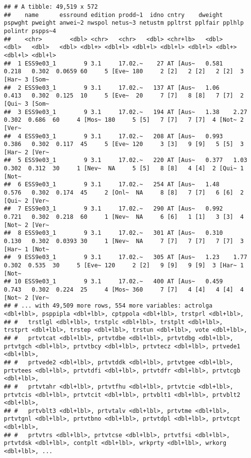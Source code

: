 \documentclass[
]{book}
\begin{document}
\begin{verbatim}
## # A tibble: 49,519 x 572
##    name      essround edition prodd~1  idno cntry    dweight pspwght pweight anwei~2 nwspol netus~3 netustm ppltrst pplfair pplhlp polintr pspps~4
##    <chr>        <dbl> <chr>   <chr>   <dbl> <chr+lb>   <dbl>   <dbl>   <dbl>   <dbl> <dbl+> <dbl+l> <dbl+l> <dbl+l> <dbl+l> <dbl+> <dbl+l> <dbl+l>
##  1 ESS9e03_1        9 3.1     17.02.~    27 AT [Aus~   0.581   0.218   0.302  0.0659 60     5 [Eve~ 180     2 [2]   2 [2]   2 [2]  3 [Har~ 3 [Som~
##  2 ESS9e03_1        9 3.1     17.02.~   137 AT [Aus~   1.06    0.413   0.302  0.125  10     5 [Eve~  20     7 [7]   8 [8]   7 [7]  2 [Qui~ 3 [Som~
##  3 ESS9e03_1        9 3.1     17.02.~   194 AT [Aus~   1.38    2.27    0.302  0.686  60     4 [Mos~ 180     5 [5]   7 [7]   7 [7]  4 [Not~ 2 [Ver~
##  4 ESS9e03_1        9 3.1     17.02.~   208 AT [Aus~   0.993   0.386   0.302  0.117  45     5 [Eve~ 120     3 [3]   9 [9]   5 [5]  3 [Har~ 2 [Ver~
##  5 ESS9e03_1        9 3.1     17.02.~   220 AT [Aus~   0.377   1.03    0.302  0.312  30     1 [Nev~  NA     5 [5]   8 [8]   4 [4]  2 [Qui~ 1 [Not~
##  6 ESS9e03_1        9 3.1     17.02.~   254 AT [Aus~   1.48    0.576   0.302  0.174  45     2 [Onl~  NA     8 [8]   7 [7]   6 [6]  2 [Qui~ 2 [Ver~
##  7 ESS9e03_1        9 3.1     17.02.~   290 AT [Aus~   0.992   0.721   0.302  0.218  60     1 [Nev~  NA     6 [6]   1 [1]   3 [3]  4 [Not~ 2 [Ver~
##  8 ESS9e03_1        9 3.1     17.02.~   301 AT [Aus~   0.310   0.130   0.302  0.0393 30     1 [Nev~  NA     7 [7]   7 [7]   7 [7]  3 [Har~ 1 [Not~
##  9 ESS9e03_1        9 3.1     17.02.~   305 AT [Aus~   1.23    1.77    0.302  0.535  30     5 [Eve~ 120     2 [2]   9 [9]   9 [9]  3 [Har~ 1 [Not~
## 10 ESS9e03_1        9 3.1     17.02.~   400 AT [Aus~   0.459   0.743   0.302  0.224  25     4 [Mos~ 360     7 [7]   4 [4]   4 [4]  4 [Not~ 2 [Ver~
## # ... with 49,509 more rows, 554 more variables: actrolga <dbl+lbl>, psppipla <dbl+lbl>, cptppola <dbl+lbl>, trstprl <dbl+lbl>,
## #   trstlgl <dbl+lbl>, trstplc <dbl+lbl>, trstplt <dbl+lbl>, trstprt <dbl+lbl>, trstep <dbl+lbl>, trstun <dbl+lbl>, vote <dbl+lbl>,
## #   prtvtcat <dbl+lbl>, prtvtdbe <dbl+lbl>, prtvtdbg <dbl+lbl>, prtvtgch <dbl+lbl>, prtvtbcy <dbl+lbl>, prtvtecz <dbl+lbl>, prtvede1 <dbl+lbl>,
## #   prtvede2 <dbl+lbl>, prtvtddk <dbl+lbl>, prtvtgee <dbl+lbl>, prtvtees <dbl+lbl>, prtvtdfi <dbl+lbl>, prtvtdfr <dbl+lbl>, prtvtcgb <dbl+lbl>,
## #   prtvtahr <dbl+lbl>, prtvtfhu <dbl+lbl>, prtvtcie <dbl+lbl>, prtvtcis <dbl+lbl>, prtvtcit <dbl+lbl>, prtvblt1 <dbl+lbl>, prtvblt2 <dbl+lbl>,
## #   prtvblt3 <dbl+lbl>, prtvtalv <dbl+lbl>, prtvtme <dbl+lbl>, prtvtgnl <dbl+lbl>, prtvtbno <dbl+lbl>, prtvtdpl <dbl+lbl>, prtvtcpt <dbl+lbl>,
## #   prtvtrs <dbl+lbl>, prtvtcse <dbl+lbl>, prtvtfsi <dbl+lbl>, prtvtdsk <dbl+lbl>, contplt <dbl+lbl>, wrkprty <dbl+lbl>, wrkorg <dbl+lbl>, ...
\end{verbatim}
\end{document}
